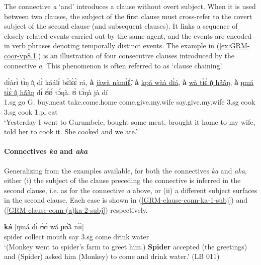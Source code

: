 The connective {\it a} `and'  introduces a clause without overt subject.  When 
it
is used between two clauses, the subject of the first clause must cross-refer to
the covert subject of the second clause  (and subsequent clauses).
It links a sequence of closely related events carried out by the same agent,
and the events are encoded in  verb
phrases denoting temporally distinct events. The example in
(\ref{ex:GRM-coor-vp8.1}) is  an illustration of four consecutive clauses
introduced by the connective  {\it a}.   This phenomenon is often referred to as
`clause chaining'. 

\ea\label{ex:GRM-coor-vp8.1}
\gll dɪ̀àrɪ̀ tɪ̀ŋ ǹ̩ dɪ̀ káálɪ́ bɛ̀lɛ̀ɛ̀ rá, \textbf{à} \underline{jàwà 
nàmɪ̃̀ɛ̃́},
\textbf{à} \underline{kpá wàà dɪ̀á}, \textbf{à}  \underline{wà tɪ̀ɛ̀ ǹ̩ 
hã́ã̀ŋ},
\textbf{à} 
\underline{ŋmá tɪ̀ɛ̀ ǹ̩ hã́ã̀ŋ} dɪ́ ʊ́ʊ́ tɔ́ŋà. ʊ̀ tɔ̀ŋà jà dí \\ 
{\advt} {\art} {\sc 1.sg} {\hest} {go} {G.}  {\foc} {\conn}  {buy.meat} 
{\conn} {take.come.home} {\conn} {come.give.my.wife}  {\conn} {say.give.my.wife}
{\comp}  {\sc 3.sg}   {cook}    {\sc 3.sg}   {cook}  {\sc 1.pl} {eat} \\
\glt  `Yesterday I went to Gurumbele,  bought some meat, brought it
home to my wife, told her to cook it. She cooked and we ate.'
\z


\paragraph{Connectives {\it ka} and {\it aka}}
\label{GRM-clause-coord-ka-aka}

Generalizing from the examples available, for both the connectives {\it ka} and 
{\it aka}, either (i) the subject of the clause preceding the connective is 
inferred in the second clause, i.e. as for  the connective  {\it a} above, or 
(ii) a different subject surfaces in the second clause. Each case is shown in 
(\ref{GRM-clause-conn-ka-1-subj}) and (\ref{GRM-clause-conn-(a)ka-2-subj}) 
respectively.   


\ea\label{GRM-clause-conn-ka-1-subj} 
    \textbf{ká}  [ŋmá dɪ́    ʊ́ʊ́  
wá  
ɲʊ̃̀ã̀ nɪ́ɪ́] \\
spider collect mouth {\postp}  {\conn} say {\comp}  
{\sc 3.sg}  come   drink water\\
\glt  `(Monkey went to spider's farm to greet him.)  \textbf{Spider} accepted
(the
greetings) and (Spider) asked him (Monkey) to come and drink water.'  (LB 011)
 \z



